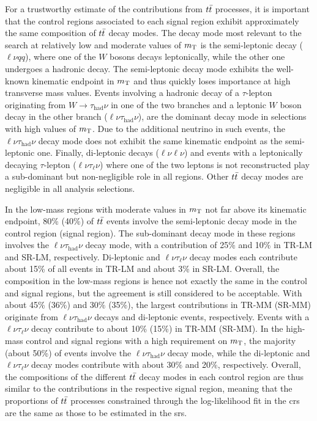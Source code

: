 For a trustworthy estimate of the contributions from $t\bar{t}$ processes, it is important that the control regions associated to each signal region exhibit approximately the same composition of $t\bar{t}$ decay modes. The decay mode most relevant to the \onelepton search at relatively low and moderate values of $m_{\textrm{T}}$ is the semi-leptonic decay ($\ell\nu qq$), where one of the $W$ bosons decays leptonically, while the other one undergoes a hadronic decay. The semi-leptonic decay mode exhibits the well-known kinematic endpoint in $m_{\textrm{T}}$ and thus quickly loses importance at high transverse mass values. Events involving a hadronic decay of a $\tau$-lepton originating from $W\to\tau_\mathrm{had}\nu$ in one of the two branches and a leptonic $W$ boson decay in the other branch ($\ell\nu\tau_\mathrm{had}\nu$), are the dominant decay mode in selections with high values of $m_{\textrm{T}}$. Due to the additional neutrino in such events, the $\ell\nu\tau_\mathrm{had}\nu$ decay mode does not exhibit the same kinematic endpoint as the semi-leptonic one. Finally, di-leptonic decays ($\ell\nu\ell\nu$) and events with a leptonically decaying $\tau$-lepton ($\ell\nu\tau_\mathrm{\ell}\nu$) where one of the two leptons is not reconstructed play a sub-dominant but non-negligible role in all regions. Other $t\bar{t}$ decay modes are negligible in all analysis selections.

 In the low-mass regions with moderate values in $m_{\textrm{T}}$ not far above its kinematic endpoint, 80\% (40\%) of $t\bar{t}$ events involve the semi-leptonic decay mode in the control region (signal region). The sub-dominant decay mode in these regions involves the $\ell\nu\tau_\mathrm{had}\nu$ decay mode, with a contribution of 25\% and 10\% in TR-LM and SR-LM, respectively. Di-leptonic and $\ell\nu\tau_\mathrm{\ell}\nu$ decay modes each contribute about 15\% of all events in TR-LM and about 3\% in SR-LM. Overall, the composition in the low-mass regions is hence not exactly the same in the control and signal regions, but the agreement is still considered to be acceptable.
 With about 45\% (36\%) and 30\% (35\%), the largest contributions in TR-MM (SR-MM) originate from $\ell\nu\tau_\mathrm{had}\nu$ decays and di-leptonic events, respectively. Events with a $\ell\nu\tau_\mathrm{\ell}\nu$ decay contribute to about 10\% (15\%) in TR-MM (SR-MM). 
 In the high-mass control and signal regions with a high requirement on $m_{\textrm{T}}$, the majority (about 50\%) of events involve the $\ell\nu\tau_\mathrm{had}\nu$ decay mode, while the di-leptonic and $\ell\nu\tau_\mathrm{\ell}\nu$ decay modes contribute with about 30\% and 20\%, respectively. Overall, the compositions of the different $t\bar{t}$ decay modes in each control region are thus similar to the contributions in the respective signal region, meaning that the proportions of $t\bar{t}$ processes constrained through the log-likelihood fit in the \glspl{cr} are the same as those to be estimated in the \glspl{sr}.

